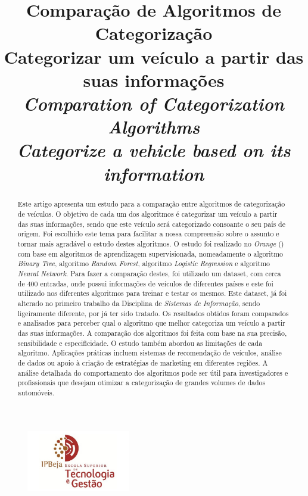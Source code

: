 \documentclass[conference]{IEEEtran}
\title{Comparação de Algoritmos de Categorização \\ \large Categorizar um veículo a partir das suas informações \\
\textit{Comparation of Categorization Algorithms \\ \large Categorize a vehicle based on its information}}
\author{
\IEEEauthorblockN{Martinho Caeiro - 23917 || Paulo Abade - 23919}
\IEEEauthorblockA{
    Instituto Politécnico de Beja\\
    Escola Superior de Tecnologia e Gestão\\
    Beja, Portugal\\
    23917@stu.ipbeja.pt || 23919@stu.ipbeja.pt
}
}
\begin{document}
\maketitle
\begin{figure}[!ht]
	\centering
	\includegraphics[width=0.4\textwidth]{Resources/Logo/IPBejaESTIG.jpg}
\end{figure}

\begin{abstract}
	Este artigo apresenta um estudo para a comparação entre algoritmos de categorização de veículos. O objetivo de cada um dos
	algoritmos é categorizar um veículo a partir das suas informações, sendo que este veículo será categorizado consoante o seu
	país de origem. Foi escolhido este tema para facilitar a nossa compreensão sobre o assunto e tornar mais agradável o estudo
	destes algoritmos. O estudo foi realizado no \textit{Orange} (\cite{orange}) com base em algoritmos de aprendizagem supervisionada, nomeadamente o algoritmo
	\textit{Binary Tree}, algoritmo \textit{Random Forest}, algoritmo \textit{Logistic Regression} e algoritmo \textit{Neural Network}.
	Para fazer a comparação destes, foi utilizado um dataset, com cerca de 400 entradas, onde possui informações de veículos de
	diferentes países e este foi utilizado nos diferentes algoritmos para treinar e testar os mesmos. Este dataset, já foi alterado
	no primeiro trabalho da Disciplina de \textit{Sistemas de Informação}, sendo ligeiramente diferente, por já ter sido tratado.
	Os resultados obtidos foram comparados e analisados para perceber qual o algoritmo que melhor categoriza um veículo a partir das
	suas informações. A comparação dos algoritmos foi feita com base na sua precisão, sensibilidade e especificidade. O estudo também
	abordou as limitações de cada algoritmo. Aplicações práticas incluem sistemas de recomendação de veículos, análise de dados ou apoio
	à criação de estratégias de marketing em diferentes regiões. A análise detalhada do comportamento dos algoritmos pode ser útil
	para investigadores e profissionais que desejam otimizar a categorização de grandes volumes de dados automóveis.

\end{abstract}
\end{document}
